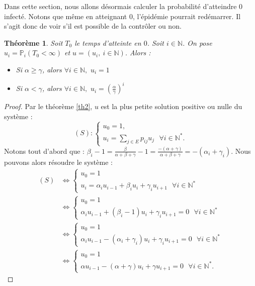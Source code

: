 \documentclass[12pt,a4paper]{report}
\newtheorem{thm}{Théorème}[section]
\theoremstyle{remark}
\begin{document}
Dans cette section, nous allons désormais calculer la probabilité d'atteindre $0$ infecté. Notons que même en atteignant $0$, l'épidémie pourrait redémarrer. Il s'agit donc de voir s'il est possible de la contrôler ou non.
\begin{thm}
Soit $T_0$ le temps d'atteinte en $0$. Soit $i \in \mathbb{N}$. On pose $u_i=\mathbb{P}_i(T_0 < \infty)$ et $u=(u_i,\  i\in \mathbb{N})$. Alors :
\begin{itemize}
    \item Si $\alpha \geqslant \gamma$, alors $\forall i \in \mathbb{N}, \, \, u_i = 1$
    \item  Si $\alpha < \gamma$, alors $\forall i \in \mathbb{N}, \, \, u_i = \left(\frac{\alpha}{\gamma}\right)^i$
\end{itemize}
\end{thm}
\begin{proof}
Par le théorème \ref{th2}, $u$ est la plus petite solution positive ou nulle du système : 
$$(S) : \left\{
\begin{array}{ll}
        u_0=1,\\
        u_i= \sum\limits_{j\in E} p_{ij}u_j \ \ \ \forall i \in \mathbb{N}^*.
    \end{array}
\right.$$
Notons tout d'abord que : $\beta_i-1 = \frac{\beta}{\alpha+\beta+\gamma}-1 = \frac{-(\alpha+\gamma)}{\alpha+\beta+\gamma} = -(\alpha_i+\gamma_i).$ Nous pouvons alors résoudre le système :
\begin{align*}
(S) &\Longleftrightarrow  \left\{
\begin{array}{ll}
        u_0=1\\
        u_i= \alpha_i u_{i-1} + \beta_i u_i + \gamma_i u_{i+1} \ \ \ \forall i \in \mathbb{N}^*
    \end{array}
\right.  \\
&\Longleftrightarrow \left\{
\begin{array}{ll}
        u_0=1\\
        \alpha_i u_{i-1} + (\beta_i-1) u_i + \gamma_i u_{i+1} = 0 \ \ \ \forall i \in \mathbb{N}^*
    \end{array}
\right.  \\
 &\Longleftrightarrow \left\{
\begin{array}{ll}
        u_0=1\\
        \alpha_i u_{i-1} - (\alpha_i+\gamma_i) u_i + \gamma_i u_{i+1} = 0 \ \ \ \forall i \in \mathbb{N}^*
    \end{array}
\right.  \\
 &\Longleftrightarrow \left\{
\begin{array}{ll}
        u_0=1\\
        \alpha u_{i-1} - (\alpha+\gamma) u_i + \gamma u_{i+1} = 0 \ \ \ \forall i \in \mathbb{N}^*.
    \end{array}
\right. 
\end{align*}


\end{proof}
\end{document}
